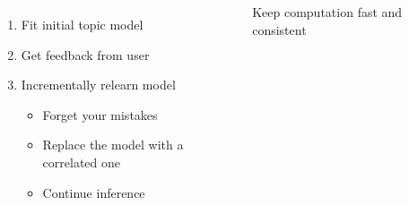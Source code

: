 \documentclass[compress]{beamer}
\begin{document}
{\begin{columns}
\begin{columns}
		\end{columns}


	\begin{enumerate}
		\item Fit initial topic model
			\pause
		\item Get feedback from user
			\pause
		\item Incrementally relearn model
			\begin{itemize}
                                \item Forget your mistakes
				\item Replace the model with a correlated one
				\item Continue inference
			\end{itemize}
	\end{enumerate}
\pause
Keep computation \alert<4>{fast and consistent} \cite{Hu-12a}
	\end{columns}

}




\end{document}

